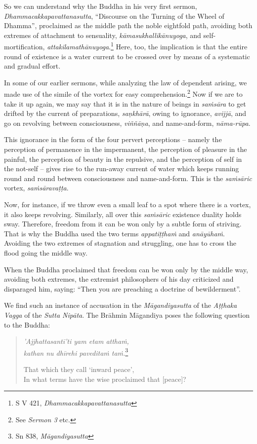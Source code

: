 So we can understand why the Buddha in his very first sermon, \emph{Dhammacakkapavattanasutta}, ``Discourse on the Turning of the Wheel of Dhamma'', proclaimed as the middle path the noble eightfold path, avoiding both extremes of attachment to sensuality, \emph{kāmasukhallikānuyoga}, and self-mortification, \emph{attakilamathānuyoga}.\footnote{S V 421, \emph{Dhammacakkapavattanasutta}} Here, too, the implication is that the entire round of existence is a water current to be crossed over by means of a systematic and gradual effort.

In some of our earlier sermons, while analyzing the law of dependent arising, we made use of the simile of the vortex for easy comprehension.\footnote{See \emph{Sermon 3} etc.} Now if we are to take it up again, we may say that it is in the nature of beings in \emph{saṁsāra} to get drifted by the current of preparations, \emph{saṇkhārā}, owing to ignorance, \emph{avijjā}, and go on revolving between consciousness, \emph{viññāṇa}, and name-and-form, \emph{nāma-rūpa}.

This ignorance in the form of the four pervert perceptions -- namely the perception of permanence in the impermanent, the perception of pleasure in the painful, the perception of beauty in the repulsive, and the perception of self in the not-self -- gives rise to the run-away current of water which keeps running round and round between consciousness and name-and-form. This is the \emph{saṁsāric} vortex, \emph{saṁsāravaṭṭa}.

Now, for instance, if we throw even a small leaf to a spot where there is a vortex, it also keeps revolving. Similarly, all over this \emph{saṁsāric} existence duality holds sway. Therefore, freedom from it can be won only by a subtle form of striving. That is why the Buddha used the two terms \emph{appatiṭṭhaṁ} and \emph{anāyūhaṁ}. Avoiding the two extremes of stagnation and struggling, one has to cross the flood going the middle way.

When the Buddha proclaimed that freedom can be won only by the middle way, avoiding both extremes, the extremist philosophers of his day criticized and disparaged him, saying: ``Then you are preaching a doctrine of bewilderment''.

We find such an instance of accusation in the \emph{Māgandiyasutta} of the \emph{Aṭṭhaka Vagga} of the \emph{Sutta Nipāta}. The Brāhmin Māgandiya poses the following question to the Buddha:

\begin{quote}
\emph{'Ajjhattasantī'ti yam etam atthaṁ,}\\
\emph{kathan nu dhīrehi paveditaṁ taṁ.}\footnote{Sn 838, \emph{Māgandiyasutta}}

That which they call `inward peace',\\
In what terms have the wise proclaimed that {[}peace{]}?
\end{quote}

